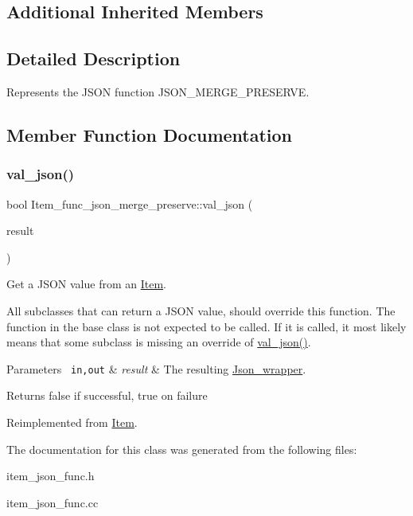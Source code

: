 \subsection*{Additional Inherited Members}


\subsection{Detailed Description}
Represents the J\+S\+ON function J\+S\+O\+N\+\_\+\+M\+E\+R\+G\+E\+\_\+\+P\+R\+E\+S\+E\+R\+VE. 

\subsection{Member Function Documentation}
\mbox{\label{classItem__func__json__merge__preserve_a50d0baf1a3e3ad6644db48253bb8990a}} 
\subsubsection{\texorpdfstring{val\+\_\+json()}{val\_json()}}
{\footnotesize\ttfamily bool Item\+\_\+func\+\_\+json\+\_\+merge\+\_\+preserve\+::val\+\_\+json (\begin{DoxyParamCaption}\item[{\mbox{\hyperlink{classJson__wrapper}{Json\+\_\+wrapper}} $\ast$}]{result }\end{DoxyParamCaption})\hspace{0.3cm}{\ttfamily [virtual]}}

Get a J\+S\+ON value from an \mbox{\hyperlink{classItem}{Item}}.

All subclasses that can return a J\+S\+ON value, should override this function. The function in the base class is not expected to be called. If it is called, it most likely means that some subclass is missing an override of \mbox{\hyperlink{classItem__func__json__merge__preserve_a50d0baf1a3e3ad6644db48253bb8990a}{val\+\_\+json()}}.


\begin{DoxyParams}[1]{Parameters}
\mbox{\texttt{ in,out}}  & {\em result} & The resulting \mbox{\hyperlink{classJson__wrapper}{Json\+\_\+wrapper}}.\\
\hline
\end{DoxyParams}
\begin{DoxyReturn}{Returns}
false if successful, true on failure 
\end{DoxyReturn}


Reimplemented from \mbox{\hyperlink{classItem_a57e763fcde2d0a819d21e31c59611290}{Item}}.



The documentation for this class was generated from the following files\+:\begin{DoxyCompactItemize}
\item 
item\+\_\+json\+\_\+func.\+h\item 
item\+\_\+json\+\_\+func.\+cc\end{DoxyCompactItemize}

